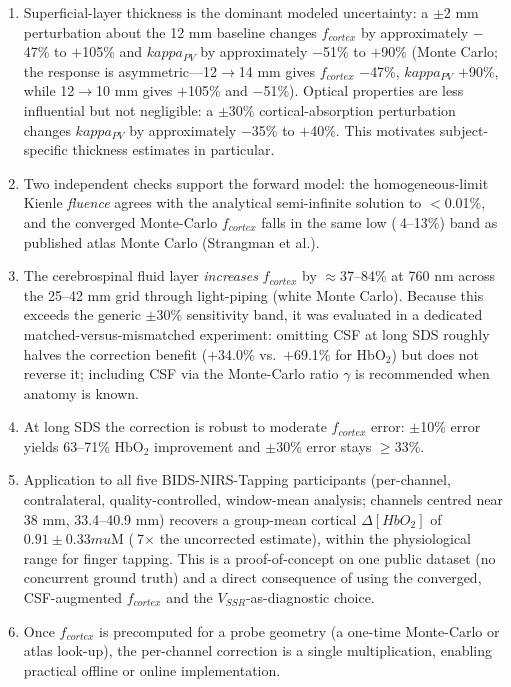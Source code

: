\documentclass[11pt]{article}
\def\kappa{kappa}%
\def\mu{mu}%
\def\sim{~}%
\def\mathrm#1{#1}%
\def\,{ }%
\begin{document}
\begin{enumerate}
\item Superficial-layer thickness is the dominant modeled uncertainty: a $\pm$2\,mm perturbation about the 12\,mm baseline changes $f_{\mathrm{cortex}}$ by approximately $-$47\% to $+$105\% and $\kappa_{\mathrm{PV}}$ by approximately $-$51\% to $+$90\% (Monte Carlo; the response is asymmetric---12$\to$14\,mm gives $f_{\mathrm{cortex}}$ $-$47\%, $\kappa_{\mathrm{PV}}$ $+$90\%, while 12$\to$10\,mm gives $+$105\% and $-$51\%). Optical properties are less influential but not negligible: a $\pm$30\% cortical-absorption perturbation changes $\kappa_{\mathrm{PV}}$ by approximately $-$35\% to $+$40\%. This motivates subject-specific thickness estimates in particular.
\item Two independent checks support the forward model: the homogeneous-limit Kienle \emph{fluence} agrees with the analytical semi-infinite solution to $<$0.01\%, and the converged Monte-Carlo $f_{\mathrm{cortex}}$ falls in the same low ($\sim$4--13\%) band as published atlas Monte Carlo (Strangman et al.\cite{r10}).
\item The cerebrospinal fluid layer \textit{increases} $f_{\mathrm{cortex}}$ by $\approx$37--84\% at 760\,nm across the 25--42\,mm grid through light-piping (white Monte Carlo). Because this exceeds the generic $\pm$30\% sensitivity band, it was evaluated in a dedicated matched-versus-mismatched experiment: omitting CSF at long SDS roughly halves the correction benefit ($+$34.0\% vs.\ $+$69.1\% for HbO$_2$) but does not reverse it; including CSF via the Monte-Carlo ratio $\gamma$ is recommended when anatomy is known.
\item At long SDS the correction is robust to moderate $f_{\mathrm{cortex}}$ error: $\pm$10\% error yields 63--71\% HbO$_2$ improvement and $\pm$30\% error stays $\geq$33\%.
\item Application to all five BIDS-NIRS-Tapping participants (per-channel, contralateral, quality-controlled, window-mean analysis; channels centred near 38\,mm, 33.4--40.9\,mm) recovers a group-mean cortical $\Delta[\mathrm{HbO}_2]$ of $0.91\pm0.33\,\mu$M ($\sim$7$\times$ the uncorrected estimate), within the physiological range for finger tapping. This is a proof-of-concept on one public dataset (no concurrent ground truth) and a direct consequence of using the converged, CSF-augmented $f_{\mathrm{cortex}}$ and the $V_{\mathrm{SSR}}$-as-diagnostic choice.
\item Once $f_{\mathrm{cortex}}$ is precomputed for a probe geometry (a one-time Monte-Carlo or atlas look-up), the per-channel correction is a single multiplication, enabling practical offline or online implementation.
\end{enumerate}
\end{document}
